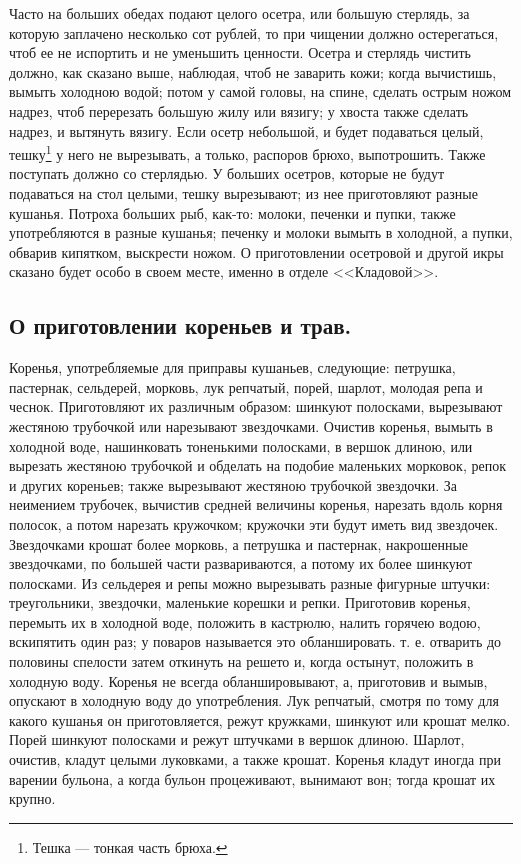 Часто на больших обедах подают целого осетра, или большую стерлядь, за которую заплачено несколько сот рублей, то при чищении должно остерегаться, чтоб ее не испортить и не уменьшить ценности. Осетра и стерлядь чистить должно, как сказано выше, наблюдая, чтоб не заварить кожи; когда вычистишь, вымыть холодною водой; потом у самой головы, на спине, сделать острым ножом надрез, чтоб перерезать большую жилу или вязигу; у хвоста также сделать надрез, и вытянуть вязигу. Если осетр небольшой, и будет подаваться целый, тешку\footnote{Тешка — тонкая часть брюха.} у него не вырезывать, а только, распоров брюхо, выпотрошить. Также поступать должно со стерлядью. У больших осетров, которые не будут подаваться на стол целыми, тешку вырезывают; из нее приготовляют разные кушанья. Потроха больших рыб, как-то: молоки, печенки и пупки, также употребляются в разные кушанья; печенку и молоки вымыть в холодной, а пупки, обварив кипятком, выскрести ножом. О приготовлении осетровой и другой икры сказано будет особо в своем месте, именно в отделе <<Кладовой>>.

\subsection*{О приготовлении кореньев и трав.}

Коренья, употребляемые для приправы кушаньев, следующие: петрушка, пастернак, сельдерей, морковь, лук репчатый, порей, шарлот, молодая репа и чеснок. Приготовляют их различным образом: шинкуют полосками, вырезывают жестяною трубочкой или нарезывают звездочками. Очистив коренья, вымыть в холодной воде, нашинковать тоненькими полосками, в вершок длиною, или вырезать жестяною трубочкой и обделать на подобие маленьких морковок, репок и других кореньев; также вырезывают жестяною трубочкой звездочки. За неимением трубочек, вычистив средней величины коренья, нарезать вдоль корня полосок, а потом нарезать кружочком; кружочки эти будут иметь вид звездочек. Звездочками крошат более морковь, а петрушка и пастернак, накрошенные звездочками, по большей части развариваются, а потому их более шинкуют полосками. Из сельдерея и репы можно вырезывать разные фигурные штучки: треугольники, звездочки, маленькие корешки и репки. Приготовив коренья, перемыть их в холодной воде, положить в кастрюлю, налить горячею водою, вскипятить один раз; у поваров называется это обланшировать. т. е. отварить до половины спелости затем откинуть на решето и, когда остынут, положить в холодную воду. Коренья не всегда обланшировывают, а, приготовив и вымыв, опускают в холодную воду до употребления. Лук репчатый, смотря по тому для какого кушанья он приготовляется, режут кружками, шинкуют или крошат мелко. Порей шинкуют полосками и режут штучками в вершок длиною. Шарлот, очистив, кладут целыми луковками, а также крошат. Коренья кладут иногда при варении бульона, а когда бульон процеживают, вынимают вон; тогда крошат их крупно.

